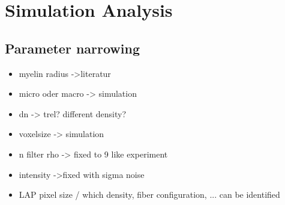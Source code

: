 \setcounter{chapter}{7}
\chapter{Simulation Analysis}
\label{cha:simulation_analysis}
% 
% 
\section{Parameter narrowing}
% 
\begin{itemize}
    \item myelin radius ->literatur
    \item micro oder macro -> simulation
    \item dn -> trel? different density?
    \item voxelsize -> simulation
    \item n filter rho -> fixed to 9 like experiment
    \item intensity ->fixed with sigma noise
    \item LAP pixel size / which density, fiber configuration, ... can be identified
\end{itemize}
% 
% 
